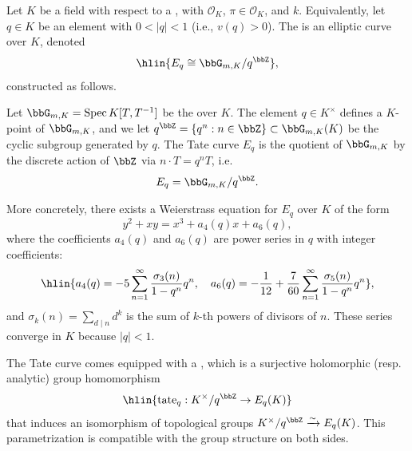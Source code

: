 \begin{definition} \label{definition:tate_curve_over_a_complete_discrete_valuation_field}
    Let $K$ be a field  with respect to a , with  $\mathcal{O}_K$,  $\pi \in \mathcal{O}_K$, and  $k$. Equivalently, let $q \in K$ be an element with $0 < |q| < 1$ (i.e., $v(q) > 0$). The  is an elliptic curve over $K$, denoted
    $$\hlin{E_q \cong \bbG_{m,K}/q^{\bbZ}},$$
    constructed as follows.

    Let $\bbG_{m,K} = \operatorname{Spec} K[T, T^{-1}]$ be the  over $K$. The element $q \in K^\times$ defines a $K$-point of $\bbG_{m,K}$, and we let $q^{\bbZ} = \{q^n : n \in \bbZ\} \subset \bbG_{m,K}(K)$ be the cyclic subgroup generated by $q$. The Tate curve $E_q$ is the quotient of $\bbG_{m,K}$ by the discrete action of $\bbZ$ via $n \cdot T = q^n T$, i.e.
    $$E_q = \bbG_{m,K}/q^{\bbZ}.$$

    More concretely, there exists a Weierstrass equation for $E_q$ over $K$ of the form
    $$y^2 + xy = x^3 + a_4(q)x + a_6(q),$$
    where the coefficients $a_4(q)$ and $a_6(q)$ are power series in $q$ with integer coefficients:
    $$\hlin{a_4(q) = -5 \sum_{n=1}^\infty \frac{\sigma_3(n)}{1 - q^n} q^n, \quad a_6(q) = -\frac{1}{12} + \frac{7}{60} \sum_{n=1}^\infty \frac{\sigma_5(n)}{1 - q^n} q^n},$$
    and $\sigma_k(n) = \sum_{d \mid n} d^k$ is the sum of $k$-th powers of divisors of $n$. These series converge in $K$ because $|q| < 1$.

    The Tate curve comes equipped with a , which is a surjective holomorphic (resp. analytic) group homomorphism
    $$\hlin{\operatorname{tate}_q : K^\times/q^{\bbZ} \to E_q(K)}$$
    that induces an isomorphism of topological groups $K^\times/q^{\bbZ} \xrightarrow{\sim} E_q(K)$. This parametrization is compatible with the group structure on both sides.


\end{definition}
